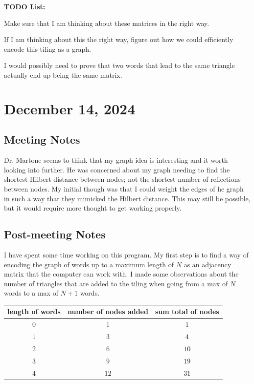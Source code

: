 \documentclass{amsart}
\begin{document}
\textbf{TODO List:}
\begin{todolist}
	\item Make sure that I am thinking about these matrices in the right way.
	\item If I am thinking about this the right way, figure out how we could efficiently encode this tiling as a graph. 
	\item I would possibly need to prove that two words that lead to the same triangle actually end up being the same matrix. 
\end{todolist}

\section{December 14, 2024}
\subsection{Meeting Notes}

Dr. Martone seems to think that my graph idea is interesting and it worth looking into further. He was concerned about my graph needing to find the shortest Hilbert distance between nodes; not the shortest number of reflections between nodes. My initial though was that I could weight the edges of he graph in such a way that they mimicked the Hilbert distance. This may still be possible, but it would require more thought to get working properly. 

\subsection{Post-meeting Notes}

I have spent some time working on this program. My first step is to find a way of encoding the graph of words up to a maximum length of $N$ as an adjacency matrix that the computer can work with. I made some observations about the number of triangles that are added to the tiling when going from a max of $N$ words to a max of $N + 1$ words. 

\begin{center}
	\bigskip
	\begin{tabular}{c | c | c}
		length of words & number of nodes added & sum total of nodes\\
		\hline
		$0$ & $1$ & $1$ \\
		$1$ & $3$ & $4$ \\
		$2$ & $6$ & $10$ \\
		$3$ & $9$ & $19$ \\
		$4$ & $12$ & $31$
	\end{tabular}
\end{center}
\end{document}
